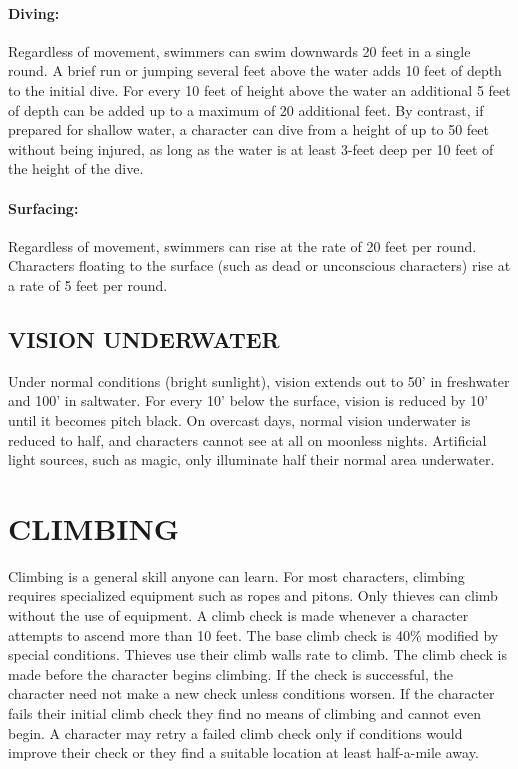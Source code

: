 \begin{multicols}{2}
\paragraph{Diving:} Regardless of movement, swimmers can swim downwards 20 feet in a single round.  A brief run or jumping several feet above the water adds 10 feet of depth to the initial dive.   For every 10 feet of height above the water an additional 5 feet of depth can be added up to a maximum of 20 additional feet.  By contrast, if prepared for shallow water, a character can dive from a height of up to 50 feet without being injured, as long as the water is at least 3-feet deep per 10 feet of the height of the dive.  

\paragraph{Surfacing:} Regardless of movement, swimmers can rise at the rate of 20 feet per round.  Characters floating to the surface (such as dead or unconscious characters) rise at a rate of 5 feet per round.
 
\subsection{VISION UNDERWATER}

Under normal conditions (bright sunlight), vision extends out to 50' in freshwater and 100' in saltwater.  For every 10' below the surface, vision is reduced by 10' until it becomes pitch black.  On overcast days, normal vision underwater is reduced to half, and characters cannot see at all on moonless nights.  Artificial light sources, such as magic, only illuminate half their normal area underwater.

\section{CLIMBING}

Climbing is a general skill anyone can learn.  For most characters, climbing requires specialized equipment such as ropes and pitons.  Only thieves can climb without the use of equipment.  A climb check is made whenever a character attempts to ascend more than 10 feet.  The base climb check is 40\% modified by special conditions.  Thieves use their climb walls rate to climb.  The climb check is made before the character begins climbing.  If the check is successful, the character need not make a new check unless conditions worsen.  If the character fails their initial climb check they find no means of climbing and cannot even begin.  A character may retry a failed climb check only if conditions would improve their check or they find a suitable location at least half-a-mile away.


\end{multicols}
